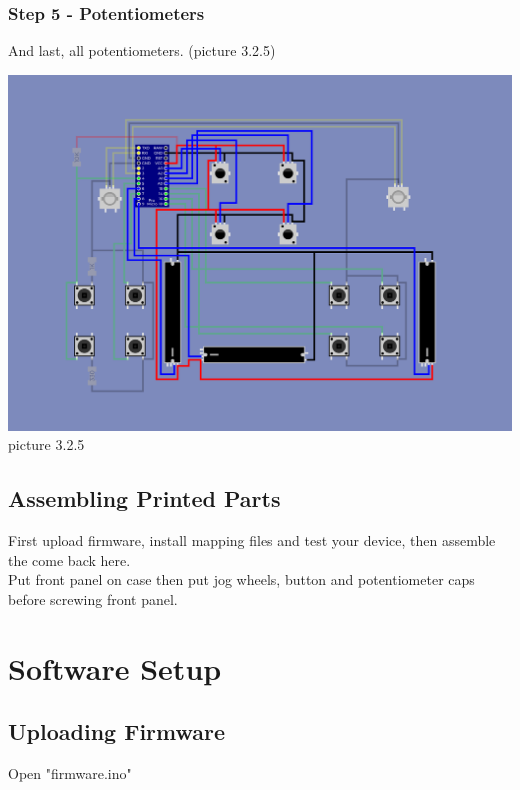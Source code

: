 \documentclass[12pt, a4paper]{article}
\begin{document}
				\newpage
			
			\subsubsection{Step 5 - Potentiometers}
						
				\noindent And last, all potentiometers. (picture 3.2.5)
				
				\begin{center}
					\includegraphics[width=1\linewidth]{assets/illustrated_schematic_step5.png}
					picture 3.2.5
				\end{center} 
				
				\newpage
			
		\subsection{Assembling Printed Parts}
			
			\noindent First upload firmware, install mapping files and test your device, then assemble the come back here. \\
		
			\noindent Put front panel on case then put jog wheels, button and potentiometer caps before screwing front panel.
			
			
	\section{Software Setup}
	
		\subsection{Uploading Firmware}
			\noindent Open "firmware.ino" \\
			
\end{document}

